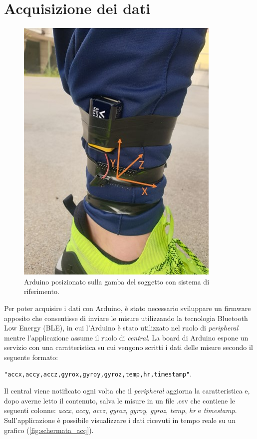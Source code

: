 \clearpage

\section{Acquisizione dei dati}
\begin{figure}[tbh]
	\centering
	\includegraphics[width=0.4\linewidth]{./ImageFiles/arduino_su_gamba_frame.jpg}
	\caption{Arduino posizionato sulla gamba del soggetto con sistema di riferimento.}
	\label{fig:arduino_su_gamba}
\end{figure}
Per poter acquisire i dati con Arduino, è stato necessario sviluppare un firmware apposito che consentisse di inviare le misure utilizzando la tecnologia Bluetooth Low Energy (BLE), in cui l'Arduino è stato utilizzato nel ruolo di \textit{peripheral} mentre l'applicazione assume il ruolo di \textit{central}. La board di Arduino espone un servizio con una caratteristica su cui vengono scritti i dati delle misure secondo il seguente formato: \\
\centerline{\texttt{"accx,accy,accz,gyrox,gyroy,gyroz,temp,hr,timestamp"}.}
Il central viene notificato ogni volta che il \textit{peripheral} aggiorna la caratteristica e, dopo averne letto il contenuto, salva le misure in un file .csv che contiene le seguenti colonne: \textit{accx}, \textit{accy}, \textit{accz}, \textit{gyrox}, \textit{gyroy}, \textit{gyroz}, \textit{temp}, \textit{hr} e \textit{timestamp}. Sull'applicazione è possibile visualizzare i dati ricevuti in tempo reale su un grafico (\Fig\ref{fig:schermata_acq}).
